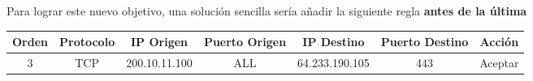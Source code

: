 Para lograr este nuevo objetivo, una solución sencilla sería añadir la siguiente regla \textbf{antes de la última} 

\begin{center}
  \begin{tabular}{ | c | c | c | c | c | c | c | }
    \hline
    Orden & Protocolo & IP Origen & Puerto Origen & IP Destino & Puerto Destino & Acción \\
    \hline
    3 & TCP & 200.10.11.100 & ALL & 64.233.190.105 & 443 & Aceptar \\
    \hline
  \end{tabular}
\end{center}











\clearpage
\printbibliography


